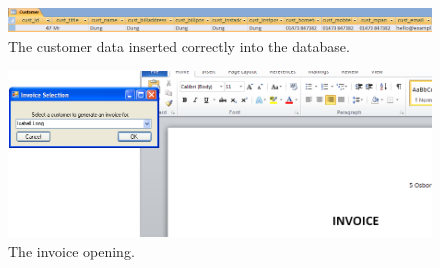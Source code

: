 \begin{figure}[ht]
	\centering
	\includegraphics[scale=0.4]{test_5dot1}
	\caption{The customer data inserted correctly into the database.}
	\label{fig:test_5dot1}
\end{figure}

\begin{figure}[ht]
	\centering
	\includegraphics[scale=0.5]{invoice-IL-select-word_scrot}
	\caption{The invoice opening.}
	\label{fig:test_6dot1}
\end{figure}